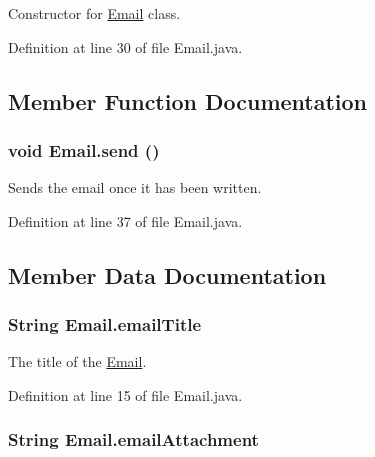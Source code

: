 Constructor for \hyperlink{classEmail}{Email} class. 



Definition at line 30 of file Email.java.

\subsection{Member Function Documentation}
\hypertarget{classEmail_6ca0324ce6902ef1f50007e7ffc91b58}{
\subsubsection{\setlength{\rightskip}{0pt plus 5cm}void Email.send ()}}
\label{classEmail_6ca0324ce6902ef1f50007e7ffc91b58}


Sends the email once it has been written. 



Definition at line 37 of file Email.java.

\subsection{Member Data Documentation}
\hypertarget{classEmail_8e8c16b0f61a273b2460f7a412a5741a}{
\subsubsection{\setlength{\rightskip}{0pt plus 5cm}String {\bf Email.emailTitle}}}
\label{classEmail_8e8c16b0f61a273b2460f7a412a5741a}


The title of the \hyperlink{classEmail}{Email}. 



Definition at line 15 of file Email.java.\hypertarget{classEmail_6a4739957b90500df5637ab0a9d127e9}{
\subsubsection{\setlength{\rightskip}{0pt plus 5cm}String {\bf Email.emailAttachment}}}
\label{classEmail_6a4739957b90500df5637ab0a9d127e9}


